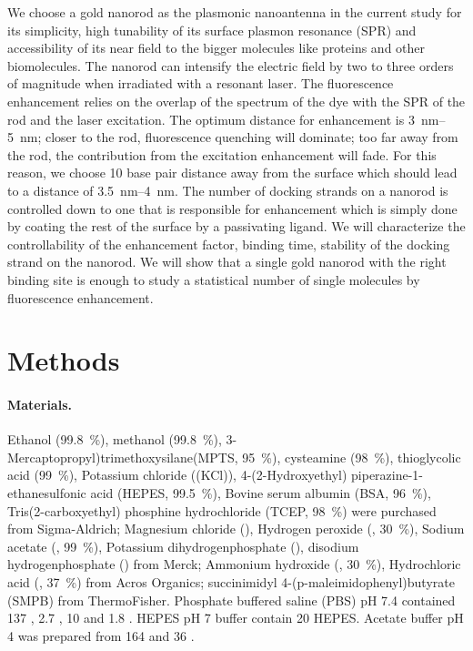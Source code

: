 We choose a gold nanorod as the plasmonic nanoantenna in the current study for its simplicity, high tunability of its surface plasmon resonance (SPR) and accessibility of its near field to the bigger molecules like proteins and other biomolecules.
The nanorod can intensify the electric field by two to three orders of magnitude when irradiated with a resonant laser.
The fluorescence enhancement relies on the overlap of the spectrum of the dye with the SPR of the rod and the laser excitation.
The optimum distance for enhancement is \SIrange{3}{5}{\nm}; closer to the rod, fluorescence quenching will dominate; too far away from the rod, the contribution from the excitation enhancement will fade.
For this reason, we choose 10 base pair distance away from the surface which should lead to a distance of \SIrange{3.5}{4}{\nm}.
The number of docking strands on a nanorod is controlled down to one that is responsible for enhancement which is simply done by coating the rest of the surface by a passivating ligand.
We will characterize the controllability of the enhancement factor, binding time, stability of the docking strand on the nanorod.
We will show that a single gold nanorod with the right binding site is enough to study a statistical number of single molecules by fluorescence enhancement.

\section{Methods}
\paragraph*{Materials.} Ethanol (\SI{99.8}{\percent}), methanol (\SI{99.8}{\percent}), 3-Mercaptopropyl)trimethoxysilane(MPTS, \SI{95}{\percent}), cysteamine (\SI{98}{\percent}), thioglycolic acid (\SI{99}{\percent}), Potassium chloride (\ce(KCl)), 4-(2-Hydroxyethyl) piperazine-1-ethanesulfonic acid (HEPES, \SI{99.5}{\percent}), Bovine serum albumin (BSA, \SI{96}{\percent}), Tris(2-carboxyethyl) phosphine hydrochloride (TCEP, \SI{98}{\percent}) were purchased from Sigma-Aldrich; 
Magnesium chloride (), Hydrogen peroxide (, \SI{30}{\percent}), Sodium acetate (, \SI{99}{\percent}), Potassium dihydrogenphosphate (), disodium hydrogenphosphate () from Merck;
Ammonium hydroxide (, \SI{30}{\percent}), Hydrochloric acid (, \SI{37}{\percent}) from Acros Organics;
succinimidyl 4-(p-maleimidophenyl)butyrate (SMPB) from ThermoFisher.
Phosphate buffered saline (PBS) pH 7.4 contained \SI{137}{\mM} , \SI{2.7}{\mM} , \SI{10}{\mM}  and \SI{1.8}{\mM} .
HEPES pH 7 buffer contain \SI{20}{\mM} HEPES. Acetate buffer pH 4 was prepared from \SI{164}{\mM}  and \SI{36}{\mM} .


